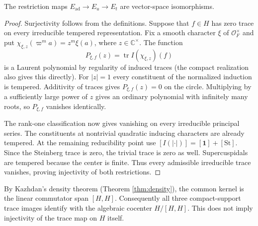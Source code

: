 \begin{theorem}\label{thm:pwcomparison}
The restriction maps $E_{\mathrm{ad}}\to E_u\to E_t$ are vector-space isomorphisms.
\end{theorem}
\begin{proof}
Surjectivity follows from the definitions. Suppose that $f\in H$ has zero trace on every irreducible tempered representation. Fix a smooth character $\xi$ of $\mathcal O_F^\times$ and put $\chi_{\xi,z}(\varpi^m a)=z^m\xi(a)$, where $z\in\mathbb C^\times$. The function
\[
P_{\xi,f}(z)=\operatorname{tr} I(\chi_{\xi,z})(f)
\]
is a Laurent polynomial by regularity of induced traces (the compact realization also gives this directly). For $|z|=1$ every constituent of the normalized induction is tempered. Additivity of traces gives $P_{\xi,f}(z)=0$ on the circle. Multiplying by a sufficiently large power of $z$ gives an ordinary polynomial with infinitely many roots, so $P_{\xi,f}$ vanishes identically.

The rank-one classification now gives vanishing on every irreducible principal series. The constituents at nontrivial quadratic inducing characters are already tempered. At the remaining reducibility point use $[I(|\cdot|)]=[\mathbf 1]+[\mathrm{St}]$. Since the Steinberg trace is zero, the trivial trace is zero as well. Supercuspidals are tempered because the center is finite. Thus every admissible irreducible trace vanishes, proving injectivity of both restrictions.
\end{proof}

By Kazhdan's density theorem (Theorem \ref{thm:density}), the common kernel is the linear commutator span $[H,H]$. Consequently all three compact-support trace images identify with the algebraic cocenter $H/[H,H]$. This does not imply injectivity of the trace map on $H$ itself.

